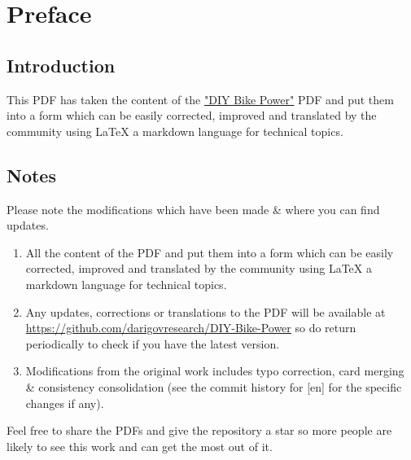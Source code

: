 \documentclass{article}
\theoremstyle{definition}
\theoremstyle{definition}
\theoremstyle{remark}
\begin{document}
\newpage

\tableofcontents

\newpage

{\color{blue}\section{Preface}} %
\label{sec:preface}

  \subsection*{Introduction} %
  \label{sub:introduction}
  
    This PDF has taken the content of the \href{https://www.demandenergyequality.org/build-your-own-bike-generators}{\underline{"DIY Bike Power"}} PDF and put them into a form which can be easily corrected, improved and translated by the community using LaTeX a markdown language for technical topics.


  \subsection*{Notes} %
  \label{sub:notes}

    Please note the modifications which have been made \& where you can find updates.

    \begin{enumerate}
      \item All the content of the PDF and put them into a form which can be easily corrected, improved and translated by the community using LaTeX a markdown language for technical topics.
      \item Any updates, corrections or translations to the PDF will be available at \href{https://github.com/darigovresearch/DIY-Bike-Power}{\underline{https://github.com/darigovresearch/DIY-Bike-Power}} so do return periodically to check if you have the latest version.
      \item Modifications from the original work includes typo correction, card merging \& consistency consolidation (see the commit history for [en] for the specific changes if any).
    \end{enumerate}

    Feel free to share the PDFs and give the repository a star so more people are likely to see this work and can get the most out of it.

\end{document}

